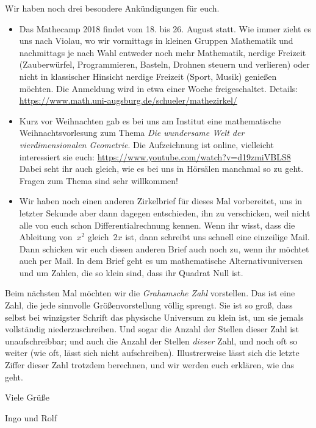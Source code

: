 \documentclass{anschreiben}
\begin{document}
Wir haben noch drei besondere Ankündigungen für euch.

\begin{itemize}
\item Das Mathecamp 2018 findet vom 18. bis 26. August statt. Wie immer zieht
es uns nach Violau, wo wir vormittags in kleinen Gruppen Mathematik und
nachmittags je nach Wahl entweder noch mehr Mathematik, nerdige Freizeit
(Zauberwürfel, Programmieren, Basteln, Drohnen steuern und verlieren) oder
nicht in klassischer Hinsicht nerdige Freizeit (Sport, Musik) genießen möchten.
Die Anmeldung wird in etwa einer Woche freigeschaltet. Details:
\url{https://www.math.uni-augsburg.de/schueler/mathezirkel/}

\item Kurz vor Weihnachten gab es bei uns am Institut eine mathematische
Weihnachtsvorlesung zum Thema \emph{Die wundersame Welt der vierdimensionalen
Geometrie}. Die Aufzeichnung ist online, vielleicht interessiert sie euch:
\url{https://www.youtube.com/watch?v=d19zmiVBLS8} Dabei seht ihr auch gleich,
wie es bei uns in Hörsälen manchmal so zu geht. Fragen zum Thema sind sehr
willkommen!

\item Wir haben noch einen anderen Zirkelbrief für dieses Mal vorbereitet, uns
in letzter Sekunde aber dann dagegen entschieden, ihn zu verschicken, weil nicht
alle von euch schon Differentialrechnung kennen. Wenn ihr wisst, dass die
Ableitung von~$x^2$ gleich~$2x$ ist, dann schreibt uns schnell eine einzeilige
Mail. Dann schicken wir euch diesen anderen Brief auch noch zu, wenn ihr
möchtet auch per Mail. In dem Brief geht es um mathematische
Alternativuniversen und um Zahlen, die so klein sind, dass ihr Quadrat Null
ist.
\end{itemize}

Beim nächsten Mal möchten wir die \emph{Grahamsche Zahl} vorstellen. Das ist
eine Zahl, die jede sinnvolle Größenvorstellung völlig sprengt. Sie ist so
groß, dass selbst bei winzigster Schrift das physische Universum zu klein ist,
um sie jemals vollständig niederzuschreiben. Und sogar die Anzahl der Stellen
dieser Zahl ist unaufschreibbar; und auch die Anzahl der Stellen \emph{dieser}
Zahl, und noch oft so weiter (wie oft, lässt sich nicht aufschreiben).
Illustrerweise lässt sich die letzte Ziffer dieser Zahl trotzdem berechnen, und
wir werden euch erklären, wie das geht.

Viele Grüße

Ingo und Rolf

\bigskip
\bigskip
\end{document}
